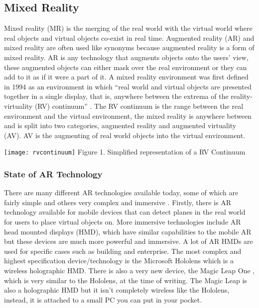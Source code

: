 \documentclass[journal]{IEEEtran}
\begin{document}
\subsection{Mixed Reality} \label{MR}
Mixed reality (MR) is the merging of the real world with the virtual world where real objects and virtual objects co-exist in real time. Augmented reality (AR) and mixed reality are often used like synonyms because augmented reality is a form of mixed reality. AR is any technology that augments objects onto the users' view, these augmented objects can either mask over the real environment or they can add to it as if it were a part of it. A mixed reality environment was first defined in 1994 as an environment in which ``real world and virtual objects are presented together in a single display, that is, anywhere between the extrema of the reality-virtuality (RV) continuum'' \cite{milgram_augmented_1994}. The RV continuum is the range between the real environment and the virtual environment, the mixed reality is anywhere between and is split into two categories, augmented reality and augmented virtuality (AV).  AV is the augmenting of real world objects into the virtual environment.

\texttt{[image: rvcontinuum]}
Figure 1. Simplified representation of a RV Continuum \cite{milgram_augmented_1994}
\newline

\subsubsection{State of AR Technology}
There are many different AR technologies available today, some of which are fairly simple and others very complex and immersive \cite{smpteconnect_smpte_nodate}. Firstly, there is AR technology available for mobile devices that can detect planes in the real world for users to place virtual objects on. More immersive technologies include AR head mounted displays (HMD), which have similar capabilities to the mobile AR but these devices are much more powerful and immersive. A lot of AR HMDs are used for specific cases such as building and enterprise. The most complex and highest specification device/technology is the Microsoft Hololens \cite{microsoft_HoloLens} which is a wireless holographic HMD. There is also a very new device, the Magic Leap One \cite{magic}, which is very similar to the Hololens, at the time of writing. The Magic Leap is also a holographic HMD but it isn't completely wireless like the Hololens, instead, it is attached to a small PC you can put in your pocket.
\end{document}
